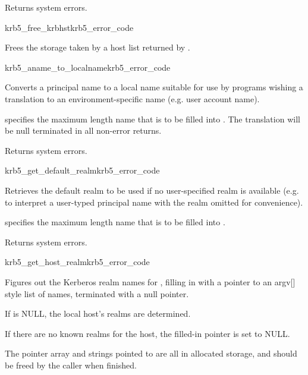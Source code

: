 Returns system errors.

\begin{funcdecl}{krb5_free_krbhst}{krb5_error_code}{\funcin}
\end{funcdecl}

Frees the storage taken by a host list returned by .

\begin{funcdecl}{krb5_aname_to_localname}{krb5_error_code}{\funcin}
\funcout
{}
\end{funcdecl}

Converts a principal name  to a local name suitable for use by
programs wishing a translation to an environment-specific name (e.g.
user account name).

 specifies the maximum length name that is to be filled into
.
The translation will be null terminated in all non-error returns.

Returns system errors.

\begin{funcdecl}{krb5_get_default_realm}{krb5_error_code}{\funcin}
\funcout
{}
\end{funcdecl}

Retrieves the default realm to be used if no user-specified realm is
available (e.g. to interpret a user-typed principal name with the
realm omitted for convenience).

 specifies the maximum length name that is to be filled into
.

Returns system errors.

\begin{funcdecl}{krb5_get_host_realm}{krb5_error_code}{\funcin}
\funcout
{}
\end{funcdecl}

Figures out the Kerberos realm names for , filling in
 with a
pointer to an argv[] style list of names, terminated with a null pointer.
 
If  is NULL, the local host's realms are determined.

If there are no known realms for the host, the filled-in pointer is set
to NULL.

The pointer array and strings pointed to are all in allocated storage,
and should be freed by the caller when finished.

